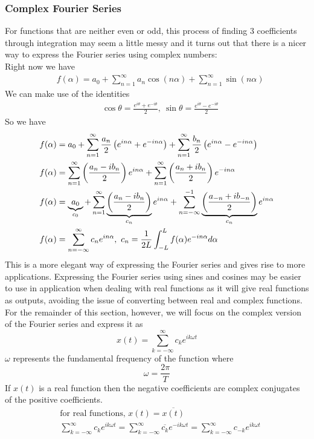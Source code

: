 \documentclass[11pt, fleqn]{article}
\begin{document}
\subsubsection{Complex Fourier Series}
For functions that are neither even or odd, this process of finding 3 coefficients through integration may seem a little messy and it turns out that there is a nicer way to express the Fourier series using complex numbers:\\
Right now we have
\begin{align*}
    &f(\alpha)=a_0+\sum_{n=1}^\infty a_n\cos(n\alpha)+\sum_{n=1}^\infty\sin(n\alpha)
\end{align*}
We can make use of the identities
\begin{align*}
    &\cos\theta=\frac{e^{i\theta}+e^{-i\theta}}{2},\ \sin\theta=\frac{e^{i\theta}-e^{-i\theta}}{2}
\end{align*}
So we have
\begin{align*}    
    &f(\alpha)=a_0+\sum_{n=1}^\infty\frac{a_n}{2}\brround{e^{in\alpha}+e^{-in\alpha}}+\sum_{n=1}^\infty\frac{b_n}{2}\brround{e^{in\alpha}-e^{-in\alpha}}\\
    &f(\alpha)=\sum_{n=1}^\infty\brround{\frac{a_n-ib_n}{2}}e^{in\alpha}+\sum_{n=1}^\infty\brround{\frac{a_n+ib_n}{2}}e^{-in\alpha}\\
    &f(\alpha)=\underbrace{a_0}_{c_0}+\sum_{n=1}^\infty\underbrace{\brround{\frac{a_n-ib_n}{2}}}_{c_n}e^{in\alpha}+\sum_{n=-\infty}^{-1}\underbrace{\brround{\frac{a_{-n}+ib_{-n}}{2}}}_{c_n}e^{in\alpha}\\
    &f(\alpha)=\sum_{n=-\infty}^\infty c_ne^{in\alpha},\ c_n=\frac{1}{2L}\int_{-L}^Lf(\alpha)e^{-in\alpha}d\alpha
\end{align*}
This is a more elegant way of expressing the Fourier series and gives rise to more applications. Expressing the Fourier series using sines and cosines may be easier to use in application when dealing with real functions as it will give real functions as outputs, avoiding the issue of converting between real and complex functions. For the remainder of this section, however, we will focus on the complex version of the Fourier series and express it as
$$\boxed{x(t)=\sum_{k=-\infty}^\infty c_ke^{ik\omega t}}$$
$\omega$ represents the fundamental frequency of the function where
$$\omega=\frac{2\pi}{T}$$
If $x(t)$ is a real function then the negative coefficients are complex conjugates of the positive coefficients.
\begin{align*}
    &\text{for real functions, }x(t)=\overline{x(t)}\\
    &\sum_{k=-\infty}^\infty c_ke^{ik\omega t}=\sum_{k=-\infty}^\infty \overline{c_k}e^{-ik\omega t}=\sum_{k=-\infty}^\infty c_{-k}e^{ik\omega t}
\end{align*}
\end{document}
